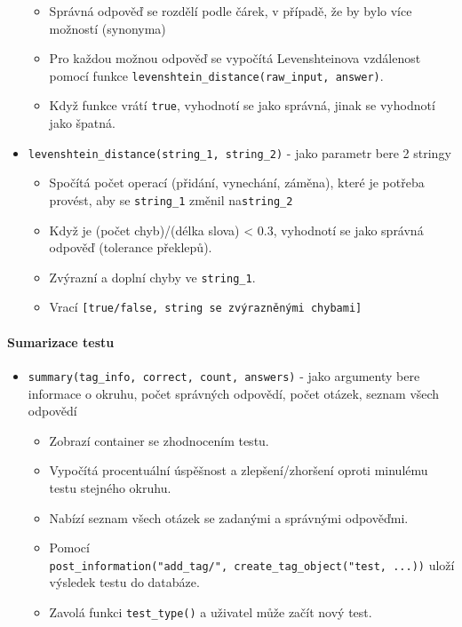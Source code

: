 \documentclass[11pt]{article}
\providecommand{\tightlist}{\setlength{\itemsep}{1pt}\setlength{\parskip}{1pt}}
\let\oldtexttt\texttt
\renewcommand{\texttt}[1]{\oldtexttt{\textcolor{codehighlight}{#1}}}
\begin{document}
\begin{itemize}
  \begin{itemize}
  \tightlist
  \item
    Správná odpověď se rozdělí podle čárek, v případě, že by bylo více
    možností (synonyma)
  \item
    Pro každou možnou odpověď se vypočítá Levenshteinova vzdálenost
    pomocí funkce \texttt{levenshtein\_distance(raw\_input,\ answer)}.
  \item
    Když funkce vrátí \texttt{true}, vyhodnotí se jako správná, jinak se
    vyhodnotí jako špatná.
  \end{itemize}
\item
  \texttt{levenshtein\_distance(string\_1,\ string\_2)} - jako parametr
  bere 2 stringy

  \begin{itemize}
  \tightlist
  \item
    Spočítá počet operací (přidání, vynechání, záměna), které je potřeba
    provést, aby se \texttt{string\_1} změnil na\texttt{string\_2}
  \item
    Když je (počet chyb)/(délka slova) \textless{} 0.3, vyhodnotí se
    jako správná odpověď (tolerance překlepů).
  \item
    Zvýrazní a doplní chyby ve \texttt{string\_1}.
  \item
    Vrací \texttt{{[}true/false,\ string\ se\ zvýrazněnými\ chybami{]}}
  \end{itemize}
\end{itemize}

\hypertarget{sumarizace-testu}{%
\paragraph{Sumarizace testu}\label{sumarizace-testu}}

\begin{itemize}
\tightlist
\item
  \texttt{summary(tag\_info,\ correct,\ count,\ answers)} - jako
  argumenty bere informace o okruhu, počet správných odpovědí, počet
  otázek, seznam všech odpovědí

  \begin{itemize}
  \tightlist
  \item
    Zobrazí container se zhodnocením testu.
  \item
    Vypočítá procentuální úspěšnost a zlepšení/zhoršení oproti minulému
    testu stejného okruhu.
  \item
    Nabízí seznam všech otázek se zadanými a správnými odpověďmi.
  \item
    Pomocí
    \texttt{post\_information("add\_tag/",\ create\_tag\_object("test,\ ...))}
    uloží výsledek testu do databáze.
  \item
    Zavolá funkci \texttt{test\_type()} a uživatel může začít nový test.
  \end{itemize}
\end{itemize}
\end{document}
